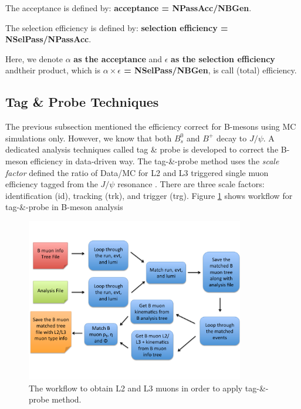 The acceptance is defined by: \textbf{acceptance = NPassAcc/NBGen}.

The selection efficiency is defined by: \textbf{selection efficiency = NSelPass/NPassAcc}.

Here, we denote $\alpha$ \textbf{as the acceptance} and $\epsilon$ \textbf{as the selection efficiency} andtheir product, which is \textbf{$\alpha \times \epsilon$ = NSelPass/NBGen}, is call (total) efficiency. 

\subsection{Tag \& Probe Techniques}

The previous subsection mentioned the efficiency correct for B-mesons using MC simulations only. However, we know that both $B^0_s$ and $B^+$ decay to $J/\psi$. A dedicated analysis techniques called tag \& probe is developed to correct the B-meson efficiency in data-driven way. The tag-\&-probe method uses the \textit{scale factor} defined the ratio of Data/MC for L2 and L3 triggered single muon efficiency tagged from the $J/\psi$ resonance \cite{TnPMethod}. There are three scale factors: identification (id), tracking (trk), and trigger (trg). Figure \ref{L2L3MuonWF} shows workflow for tag-\&-probe in B-meson analysis


\begin{figure}[h]
\begin{center}
\includegraphics[width= 0.85\textwidth]{Figures/Chapter4/L2L3MuonWF.pdf}
\caption{The workflow to obtain L2 and L3 muons in order to apply tag-\&-probe method.}
\label{L2L3MuonWF}
\end{center}
\end{figure}

